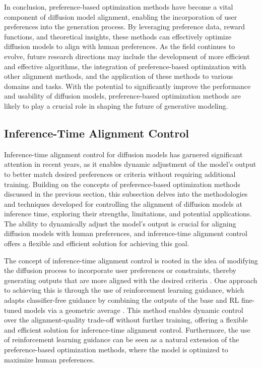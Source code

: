 \documentclass[11pt,a4paper]{article}
\begin{document}
In conclusion, preference-based optimization methods have become a vital component of diffusion model alignment, enabling the incorporation of user preferences into the generation process. By leveraging preference data, reward functions, and theoretical insights, these methods can effectively optimize diffusion models to align with human preferences. As the field continues to evolve, future research directions may include the development of more efficient and effective algorithms, the integration of preference-based optimization with other alignment methods, and the application of these methods to various domains and tasks. With the potential to significantly improve the performance and usability of diffusion models, preference-based optimization methods are likely to play a crucial role in shaping the future of generative modeling.


\subsection{Inference-Time Alignment Control}


Inference-time alignment control for diffusion models has garnered significant attention in recent years, as it enables dynamic adjustment of the model's output to better match desired preferences or criteria without requiring additional training. Building on the concepts of preference-based optimization methods discussed in the previous section, this subsection delves into the methodologies and techniques developed for controlling the alignment of diffusion models at inference time, exploring their strengths, limitations, and potential applications. The ability to dynamically adjust the model's output is crucial for aligning diffusion models with human preferences, and inference-time alignment control offers a flexible and efficient solution for achieving this goal.

The concept of inference-time alignment control is rooted in the idea of modifying the diffusion process to incorporate user preferences or constraints, thereby generating outputs that are more aligned with the desired criteria \cite{arxiv:2410.02543}. One approach to achieving this is through the use of reinforcement learning guidance, which adapts classifier-free guidance by combining the outputs of the base and RL fine-tuned models via a geometric average \cite{arxiv:2508.21016}. This method enables dynamic control over the alignment-quality trade-off without further training, offering a flexible and efficient solution for inference-time alignment control. Furthermore, the use of reinforcement learning guidance can be seen as a natural extension of the preference-based optimization methods, where the model is optimized to maximize human preferences.
\end{document}
